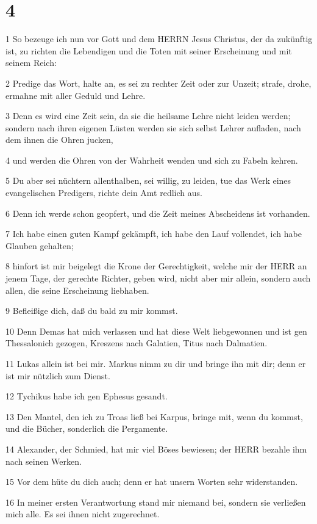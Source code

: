 \chapter{4}

\par 1 So bezeuge ich nun vor Gott und dem HERRN Jesus Christus, der da zukünftig ist, zu richten die Lebendigen und die Toten mit seiner Erscheinung und mit seinem Reich:
\par 2 Predige das Wort, halte an, es sei zu rechter Zeit oder zur Unzeit; strafe, drohe, ermahne mit aller Geduld und Lehre.
\par 3 Denn es wird eine Zeit sein, da sie die heilsame Lehre nicht leiden werden; sondern nach ihren eigenen Lüsten werden sie sich selbst Lehrer aufladen, nach dem ihnen die Ohren jucken,
\par 4 und werden die Ohren von der Wahrheit wenden und sich zu Fabeln kehren.
\par 5 Du aber sei nüchtern allenthalben, sei willig, zu leiden, tue das Werk eines evangelischen Predigers, richte dein Amt redlich aus.
\par 6 Denn ich werde schon geopfert, und die Zeit meines Abscheidens ist vorhanden.
\par 7 Ich habe einen guten Kampf gekämpft, ich habe den Lauf vollendet, ich habe Glauben gehalten;
\par 8 hinfort ist mir beigelegt die Krone der Gerechtigkeit, welche mir der HERR an jenem Tage, der gerechte Richter, geben wird, nicht aber mir allein, sondern auch allen, die seine Erscheinung liebhaben.
\par 9 Befleißige dich, daß du bald zu mir kommst.
\par 10 Denn Demas hat mich verlassen und hat diese Welt liebgewonnen und ist gen Thessalonich gezogen, Kreszens nach Galatien, Titus nach Dalmatien.
\par 11 Lukas allein ist bei mir. Markus nimm zu dir und bringe ihn mit dir; denn er ist mir nützlich zum Dienst.
\par 12 Tychikus habe ich gen Ephesus gesandt.
\par 13 Den Mantel, den ich zu Troas ließ bei Karpus, bringe mit, wenn du kommst, und die Bücher, sonderlich die Pergamente.
\par 14 Alexander, der Schmied, hat mir viel Böses bewiesen; der HERR bezahle ihm nach seinen Werken.
\par 15 Vor dem hüte du dich auch; denn er hat unsern Worten sehr widerstanden.
\par 16 In meiner ersten Verantwortung stand mir niemand bei, sondern sie verließen mich alle. Es sei ihnen nicht zugerechnet.
